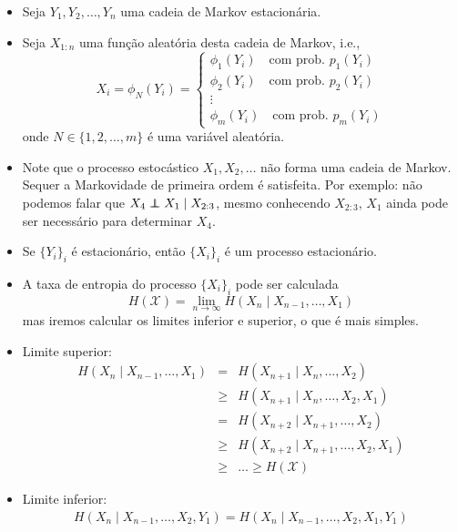\begin{frame}[allowframebreaks]
  \begin{itemize}
  \item Seja $Y_1, Y_2, \ldots, Y_n$ uma cadeia de Markov estacionária.
  \item Seja $X_{1:n}$ uma função aleatória desta cadeia de Markov, i.e.,
	\begin{equation}
	X_i = \phi_N (Y_i) = \begin{cases}
				\phi_1 (Y_i) \quad \text{com prob. } p_1(Y_i) \\
				\phi_2 (Y_i) \quad \text{com prob. } p_2(Y_i) \\
				\vdots \\
				\phi_m (Y_i) \quad \text{com prob. } p_m(Y_i) 
				\end{cases}
	\end{equation}
	onde $N \in \{1,2,\ldots,m\}$ é uma variável aleatória.
  \item Note que o processo estocástico $X_1,X_2,\ldots$ não forma uma cadeia de Markov. Sequer a Markovidade de primeira ordem é satisfeita.
	Por exemplo: não podemos falar que $X_4 \independent X_1 \mid X_{2:3}$, 
	mesmo conhecendo $X_{2:3}$, $X_1$ ainda pode ser necessário para determinar $X_4$.
  \item Se $\{Y_i\}_i$ é estacionário, então $\{X_i\}_i$ é um processo estacionário.
  \item A taxa de entropia do processo $\{X_i\}_i$ pode ser calculada
	\begin{equation}
	H(\mathcal{X}) = \lim_{n \rightarrow \infty} H(X_n \mid X_{n-1}, \ldots, X_1) 
	\end{equation}
	mas iremos calcular os limites inferior e superior, o que é mais simples.
  \item Limite superior:
	\begin{eqnarray}
	H(X_n \mid X_{n-1}, \ldots, X_1) &=& H(X_{n+1} \mid X_{n}, \ldots, X_2) \nonumber \\
		&\geq& H(X_{n+1} \mid X_{n}, \ldots, X_2, X_1) \nonumber \\
		&=& H(X_{n+2} \mid X_{n+1}, \ldots, X_2) \nonumber \\
		&\geq& H(X_{n+2} \mid X_{n+1}, \ldots, X_2, X_1) \nonumber \\
		&\geq& \ldots \geq H(\mathcal{X})
	\end{eqnarray}
  \item Limite inferior:
	\begin{eqnarray}
	H(X_n \mid X_{n-1}, \ldots, X_2, Y_1) = H(X_n \mid X_{n-1}, \ldots, X_2, X_1,Y_1) \nonumber \\

\end{eqnarray}
\end{itemize}
\end{frame}
